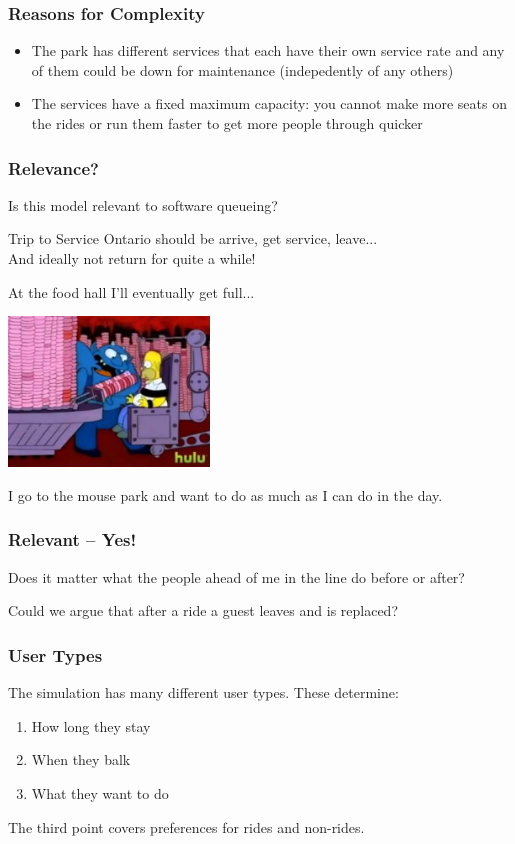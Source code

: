 \begin{frame}
\frametitle{Reasons for Complexity}

\begin{itemize}
	\item The park has different services that each have their own service rate and any of them could be down for maintenance (indepedently of any others) \vspace{5em}
	\item The services have a fixed maximum capacity: you cannot make more seats on the rides or run them faster to get more people through quicker
\end{itemize}


\end{frame}


\begin{frame}
\frametitle{Relevance?}

Is this model relevant to software queueing?

Trip to Service Ontario should be arrive, get service, leave...\\
\quad And ideally not return for quite a while!

At the food hall I'll eventually get full...

\begin{center}
	\includegraphics[width=0.4\textwidth]{images/donuthell.jpg}
\end{center}

I go to the mouse park and want to do as much as I can do in the day.

\end{frame}


\begin{frame}
\frametitle{Relevant -- Yes!}

Does it matter what the people ahead of me in the line do before or after?

Could we argue that after a ride a guest leaves and is replaced?

\end{frame}


\begin{frame}
\frametitle{User Types}

The simulation has many different user types. These determine:

\begin{enumerate}
	\item How long they stay
	\item When they balk
	\item What they want to do
\end{enumerate}

The third point covers preferences for rides and non-rides.


\end{frame}


